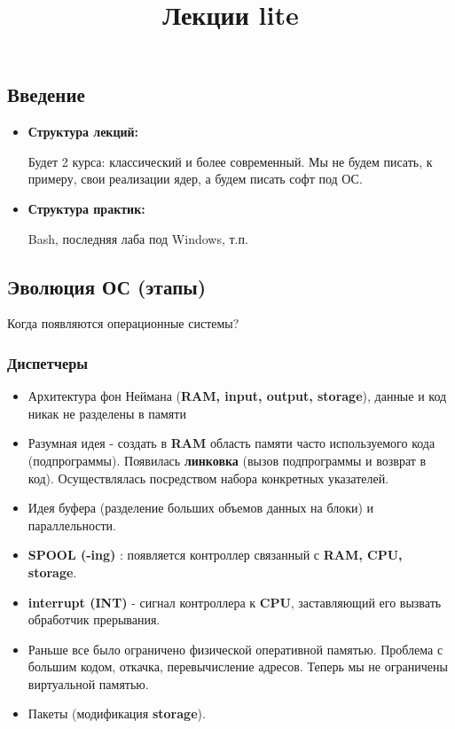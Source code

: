 \documentclass[12pt, a4paper]{report}
\title{Лекции lite}
\author{}
\begin{document}
\maketitle

\tableofcontents
 
\chapter[7 февраля 2019]{}

\section{Введение}
\begin{itemize}
    \item \textbf{Структура лекций:}

    Будет 2 курса: классический и более современный. Мы не будем писать, к примеру, свои реализации ядер, а будем писать софт под ОС.

    \item \textbf{Структура практик:}

    Bash, последняя лаба под Windows, т.п.
\end{itemize}

\section{Эволюция ОС (этапы)}
Когда появляются операционные системы?

\subsection{Диспетчеры}
\begin{itemize}
    \item Архитектура фон Неймана (\textbf{RAM, input, output, storage}), данные и код никак не разделены в памяти

    \item Разумная идея - создать в \textbf{RAM} область памяти часто используемого кода (подпрограммы). Появилась \textbf{линковка} (вызов подпрограммы и возврат в код). Осуществлялась посредством набора конкретных указателей.

    \item Идея буфера (разделение больших объемов данных на блоки) и параллельности.

    \item \textbf{SPOOL (-ing)} : появляется контроллер связанный с \textbf{RAM, CPU, storage}.

    \item \textbf{interrupt (INT)} - сигнал контроллера к \textbf{CPU}, заставляющий его вызвать обработчик прерывания.

    \item Раньше все было ограничено физической оперативной памятью. Проблема с большим кодом, откачка, перевычисление адресов. Теперь мы не ограничены виртуальной памятью.

    \item Пакеты (модификация \textbf{storage}).
\end{itemize}
\end{document}
